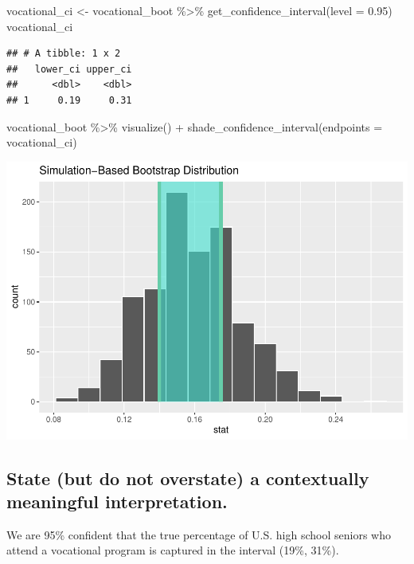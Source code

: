 \documentclass[
]{book}
\newenvironment{Shaded}{\begin{snugshade}}{\end{snugshade}}
\newcommand{\AttributeTok}[1]{\textcolor[rgb]{0.77,0.63,0.00}{#1}}
\newcommand{\FloatTok}[1]{\textcolor[rgb]{0.00,0.00,0.81}{#1}}
\newcommand{\FunctionTok}[1]{\textcolor[rgb]{0.00,0.00,0.00}{#1}}
\newcommand{\NormalTok}[1]{#1}
\newcommand{\OtherTok}[1]{\textcolor[rgb]{0.56,0.35,0.01}{#1}}
\newcommand{\SpecialCharTok}[1]{\textcolor[rgb]{0.00,0.00,0.00}{#1}}
\begin{document}
\begin{Shaded}
\begin{Highlighting}[]
\NormalTok{vocational\_ci }\OtherTok{\textless{}{-}}\NormalTok{ vocational\_boot }\SpecialCharTok{\%\textgreater{}\%}
    \FunctionTok{get\_confidence\_interval}\NormalTok{(}\AttributeTok{level =} \FloatTok{0.95}\NormalTok{)}
\NormalTok{vocational\_ci}
\end{Highlighting}
\end{Shaded}

\begin{verbatim}
## # A tibble: 1 x 2
##   lower_ci upper_ci
##      <dbl>    <dbl>
## 1     0.19     0.31
\end{verbatim}

\begin{Shaded}
\begin{Highlighting}[]
\NormalTok{vocational\_boot }\SpecialCharTok{\%\textgreater{}\%}
    \FunctionTok{visualize}\NormalTok{() }\SpecialCharTok{+}
    \FunctionTok{shade\_confidence\_interval}\NormalTok{(}\AttributeTok{endpoints =}\NormalTok{ vocational\_ci)}
\end{Highlighting}
\end{Shaded}

\includegraphics{intro_stats_files/figure-latex/unnamed-chunk-331-1.pdf}

\hypertarget{ci-ex-interpret}{%
\subsection{State (but do not overstate) a contextually meaningful interpretation.}\label{ci-ex-interpret}}

We are 95\% confident that the true percentage of U.S. high school seniors who attend a vocational program is captured in the interval (19\%, 31\%).
\end{document}
